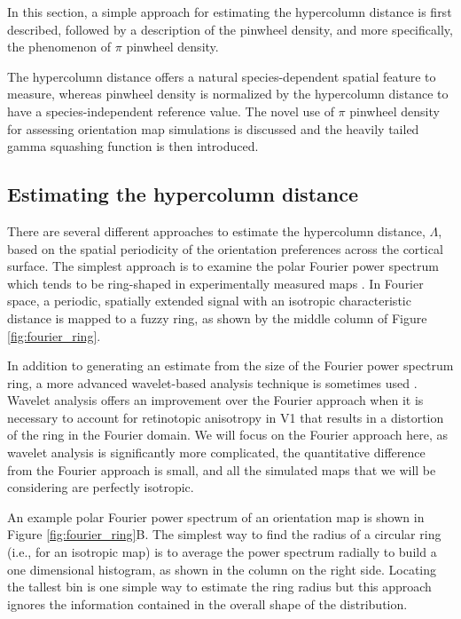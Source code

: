 \documentclass[phd,ianc,twoside]{infthesis}
\begin{document}
In this section, a simple approach for estimating the hypercolumn
distance is first described, followed by a description of the pinwheel
density, and more specifically, the phenomenon of $\pi$ pinwheel
density.

The hypercolumn distance offers a natural species-dependent spatial
feature to measure, whereas pinwheel density is normalized by 
the hypercolumn distance to have a species-independent
reference value. The novel use of $\pi$ pinwheel density for assessing
orientation map simulations is discussed and the heavily tailed gamma
squashing function is then introduced.

\subsection{Estimating the hypercolumn distance}
\label{section:hypercolumn_distance}

There are several different approaches to estimate the hypercolumn
distance, $\Lambda$, based on the spatial periodicity of the orientation
preferences across the cortical surface. The simplest approach is to
examine the polar Fourier power spectrum which tends to be ring-shaped in
experimentally measured maps \citep{erwin_nc95,blasdel_jn92a}. In
Fourier space, a periodic, spatially extended signal with an isotropic
characteristic distance is mapped to a fuzzy ring, as shown by the
middle column of Figure \ref{fig:fourier_ring}.

In addition to generating an estimate from the size of the Fourier power
spectrum ring, a more advanced wavelet-based analysis technique is
sometimes used \citep{kaschube_science10}. Wavelet analysis offers an
improvement over the Fourier approach when it is necessary to account
for retinotopic anisotropy in V1 that results in a distortion of the
ring in the Fourier domain. We will focus on the Fourier approach here, as
wavelet analysis is significantly more complicated, the quantitative
difference from the Fourier approach is small, and all the simulated
maps that we will be considering are perfectly isotropic.

An example polar Fourier power spectrum of an orientation map is shown
in Figure \ref{fig:fourier_ring}B. The simplest way to find the radius
of a circular ring (i.e., for an isotropic map) is to average the power
spectrum radially to build a one dimensional histogram, as shown in the
column on the right side. Locating the tallest bin is one simple way to
estimate the ring radius but this approach ignores the information
contained in the overall shape of the distribution.
\end{document}
